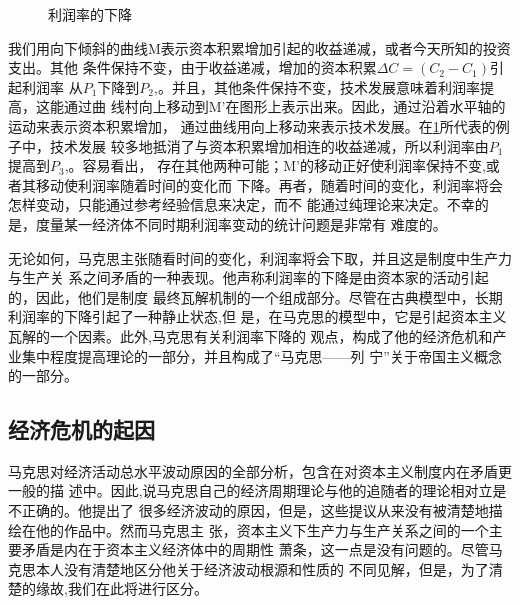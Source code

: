 \begin{figure}[ht]
  \centering
{}%
\caption{\label{fig：marxlirun}利润率的下降 }
\end{figure}

我们用向下倾斜的曲线M表示资本积累增加引起的收益递减，或者今天所知的投资支出。其他
条件保持不变，由于收益递减，增加的资本积累$\Delta C=(C_2 - C_1)$引起利润率
从$P_1$下降到$P_2$,。并且，其他条件保持不变，技术发展意味着利润率提高，这能通过曲
线村向上移动到M'在图形上表示出来。因此，通过沿着水平轴的运动来表示资本积累增加，
通过曲线用向上移动来表示技术发展。在\cref{fig：marxlirun}所代表的例子中，技术发展
较多地抵消了与资本积累增加相连的收益递减，所以利润率由$P_1$提高到$P_3$,。容易看出，
存在其他两种可能；M'的移动正好使利润率保持不变,或者其移动使利润率随着时间的变化而
下降。再者，随着时间的变化，利润率将会怎样变动，只能通过参考经验信息来决定，而不
能通过纯理论来决定。不幸的是，度量某一经济体不同时期利润率变动的统计问题是非常有
难度的。


无论如何，马克思主张随看时间的变化，利润率将会下取，并且这是制度中生产力与生产关
系之间矛盾的一种表现。他声称利润率的下降是由资本家的活动引起的，因此，他们是制度
最终瓦解机制的一个组成部分。尽管在古典模型中，长期利润率的下降引起了一种静止状态,但
是，在马克思的模型中，它是引起资本主义瓦解的一个因素。此外,马克思有关利润率下降的
观点，构成了他的经济危机和产业集中程度提高理论的一部分，并且构成了“马克思——列
宁”关于帝国主义概念的一部分。

\subsection{经济危机的起因}

马克思对经济活动总水平波动原因的全部分析，包含在对资本主义制度内在矛盾更一般的描
述中。因此,说马克思自己的经济周期理论与他的追随者的理论相对立是不正确的。他提出了
很多经济波动的原因，但是，这些提议从来没有被清楚地描绘在他的作品中。然而马克思主
张，资本主义下生产力与生产关系之间的一个主要矛盾是内在于资本主义经济体中的周期性
萧条，这一点是没有问题的。尽管马克思本人没有清楚地区分他关于经济波动根源和性质的
不同见解，但是，为了清楚的缘故,我们在此将进行区分。

